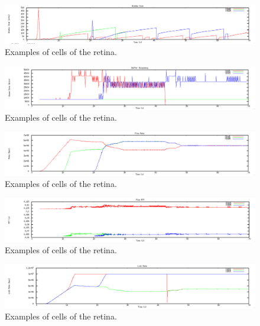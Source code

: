 \documentclass[12pt]{article}
\begin{document}
\begin{figure}[t]
\centering \includegraphics[scale=.35]{figures/Test2_Tahoe/window_size.png}
\caption{Examples of cells of the retina.}
\label{fig:test2_tahoe_window_size}
\end{figure}




\begin{figure}[t]
\centering \includegraphics[scale=.35]{figures/Test2_Vegas/buffer_occ.png}
\caption{Examples of cells of the retina.}
\label{fig:test2_vegas_buffer_occ}
\end{figure}

\begin{figure}[t]
\centering \includegraphics[scale=.35]{figures/Test2_Vegas/flow_rate.png}
\caption{Examples of cells of the retina.}
\label{fig:test2_vegas_flow_rate}
\end{figure}

\begin{figure}[t]
\centering \includegraphics[scale=.35]{figures/Test2_Vegas/flow_rtt.png}
\caption{Examples of cells of the retina.}
\label{fig:test2_vegas_flow_rtt}
\end{figure}

\begin{figure}[t]
\centering \includegraphics[scale=.35]{figures/Test2_Vegas/link_rate.png}
\caption{Examples of cells of the retina.}
\label{fig:test2_vegas_link_rate}
\end{figure}
\end{document}
